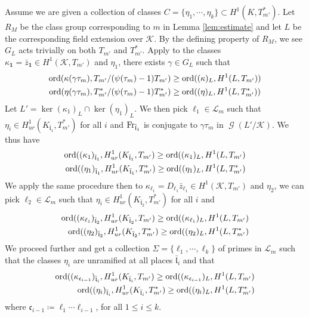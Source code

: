 \documentclass[leqno]{amsart}
\theoremstyle{definition}
\theoremstyle{remark}
\newcommand{\id}{\mathbf{1}}
\DeclareMathOperator{\Gal}{\mathcal{G}}
\newcommand{\Fr}{\textnormal{Fr}} %
\newcommand{\fc}{\mathfrak{c}}
\newcommand{\fl}{\mathfrak{l}}
\newcommand{\K}{{\mathcal{K}}} %
\newcommand{\flw}{\bar{\fl}}
\newcommand{\ord}{\textnormal{ord}} %
\begin{document}
Assume we are given a collection of classes
$C=\{\eta_1,\cdots,\eta_k\}\subset H^1(K,T_{m'}^*)$.
Let $R_M$ be the class group corresponding to $m$ 
in Lemma \ref{lem:estimate}
and let $L$ be the corresponding field extension over  $\K$.
By the defining property of $R_M$,
we see  $G_L$ acts trivially on both  $T_{m'}$ and $T_{m'}^*$.
Apply \cite[Lem 5.2.1]{Rubin}
to the classes $\kappa_{\id}=\bar{z}_{\id}\in H^1(\K,T_{m'})$
and $\eta_1$, 
there exists  $\gamma\in G_L$ such that
\begin{align*}
	\ord(\kappa(\gamma\tau_m),T_{m'}/(\psi(\tau_m)-1)T_{m'})&\geq
	\ord( (\kappa)_L, H^1(L,T_{m'}) )\\
	\ord(\eta(\gamma\tau_m),T_{m'}^*/(\psi(\tau_m)-1)T_{m'}^*)&\geq
	\ord( (\eta)_L, H^1(L,T_{m'}^*) ) 
\end{align*}
Let $L'=\ker(\kappa_1)_L\cap \ker(\eta_1)_L$.
We then pick $\ell_1\in \mathcal{L}_m$ such that
$\eta_i\in H^1_{ur}(K_{\flw_1},T_{m'}^*)$ for all $i$
and $\Fr_{\flw_1}$ is conjugate to $\gamma\tau_m$ in  $\Gal(L'/\K)$.
We thus have
\begin{align*}
	\ord( (\kappa_1)_{\flw_1}, H^1_{ur}(K_{\flw_1}, T_{m'})\geq
	\ord( (\kappa_1)_{L}, H^1(L, T_{m'})\\
	\ord( (\eta_1)_{\flw_1}, H^1_{ur}(K_{\flw_1}, T_{m'}^*)\geq
	\ord( (\eta_1)_{L}, H^1(L, T_{m'}^*)
\end{align*}
We apply the same procedure then to
$\kappa_{\ell_1}=D_{\ell_1}\bar{z}_{\ell_1}\in H^1(\K,T_{m'})$
and $\eta_2$,
we can pick $\ell_2\in \mathcal{L}_m$ such that
$\eta_i\in H^1_{ur}(K_{\flw_2},T_{m'}^*)$ for all $i$ and
\begin{align*}
	\ord( (\kappa_{\ell_1})_{\flw_2}, H^1_{ur}(K_{\flw_2}, T_{m'})\geq
	\ord( (\kappa_{\ell_1})_{L}, H^1(L, T_{m'})\\
	\ord( (\eta_2)_{\flw_2}, H^1_{ur}(K_{\flw_2}, T_{m'}^*)\geq
	\ord( (\eta_2)_{L}, H^1(L, T_{m'}^*)
\end{align*}
We proceed further and get a collection 
$\Sigma=\{\ell_1,\cdots,\ell_k\}$ of primes in $\mathcal{L}_m$
such that the classes  $\eta_i$ are unramified
at all places  $\flw_i$ and that
\begin{align*}
	\ord( (\kappa_{\fc_{i-1}})_{\flw_i}, H^1_{ur}(K_{\flw_i}, T_{m'})\geq
	\ord( (\kappa_{\fc_{i-1}})_{L}, H^1(L, T_{m'})\\
	\ord( (\eta_i)_{\flw_i}, H^1_{ur}(K_{\flw_i}, T_{m'}^*)\geq
	\ord( (\eta_i)_{L}, H^1(L, T_{m'}^*)
\end{align*}
where $\fc_{i-1}\coloneqq \ell_1\cdots\ell_{i-1}$, for all $1\leq i\leq k$.
\end{document}
